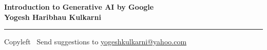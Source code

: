 
\graphicspath{{images/}}

\footnotesize


\begin{center}
\Large{\textbf{Introduction to Generative AI by Google\\ Yogesh Haribhau Kulkarni}}  
\end{center}

\begin{multicols}{2}

\end{multicols}

\rule{\linewidth}{0.25pt}
\scriptsize
Copyleft \textcopyleft\  Send suggestions to 
\href{http://www.yogeshkulkarni.com}{yogeshkulkarni@yahoo.com}


